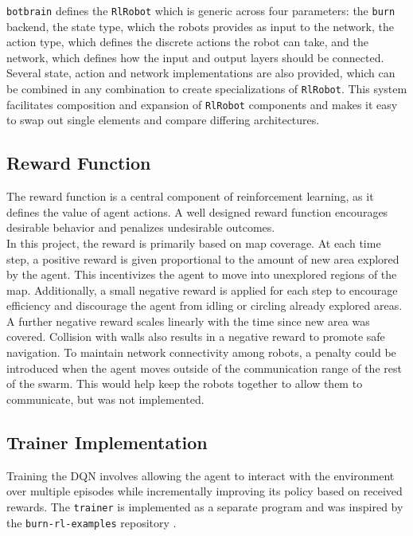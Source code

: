 \texttt{botbrain} defines the \texttt{RlRobot} which is generic across four parameters: the \texttt{burn} backend, the state type, which the robots provides as input to the network, the action type, which defines the discrete actions the robot can take, and the network, which defines how the input and output layers should be connected. Several state, action and network implementations are also provided, which can be combined in any combination to create specializations of \texttt{RlRobot}. This system facilitates composition and expansion of \texttt{RlRobot} components and makes it easy to swap out single elements and compare differing architectures.

\subsection{Reward Function}
The reward function is a central component of reinforcement learning, as it defines the value of agent actions. A well designed reward function encourages desirable behavior and penalizes undesirable outcomes. \\

In this project, the reward is primarily based on map coverage. At each time step, a positive reward is given proportional to the amount of new area explored by the agent. This incentivizes the agent to move into unexplored regions of the map. Additionally, a small negative reward is applied for each step to encourage efficiency and discourage the agent from idling or circling already explored areas. A further negative reward scales linearly with the time since new area was covered. Collision with walls also results in a negative reward to promote safe navigation. To maintain network connectivity among robots, a penalty could be introduced when the agent moves outside of the communication range of the rest of the swarm. This would help keep the robots together to allow them to communicate, but was not implemented.

\subsection{Trainer Implementation}
Training the DQN involves allowing the agent to interact with the environment over multiple episodes while incrementally improving its policy based on received rewards. The \texttt{trainer} is implemented as a separate program and was inspired by the \texttt{burn-rl-examples} repository \cite{burn-rl-examples}. \\

